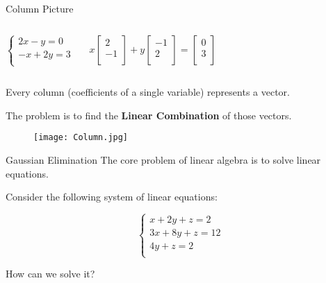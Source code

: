 \documentclass{beamer}
\begin{document}
\begin{frame}{Column Picture}
\begin{columns}
\begin{equation*}
    \begin{cases}
	2x-y=0\\
	-x+2y=3\\
\end{cases}
\end{equation*}

\vspace{-9pt}
\begin{equation*}
    x\left[ \begin{array}{c}
	2\\
	-1\\
\end{array} \right] +y\left[ \begin{array}{c}
	-1\\
	2\\
\end{array} \right] =\left[ \begin{array}{c}
	0\\
	3\\
\end{array} \right]
\end{equation*}
\end{columns}

\vspace{4pt}
Every column (coefficients of a single variable) represents a vector.

The problem is to find the \textbf{Linear Combination} of those vectors.
\vspace{-1.03pt}

\begin{figure}
    \centering
    \texttt{[image: Column.jpg]}
\end{figure}

\end{frame}

\begin{frame}{Gaussian Elimination}
The core problem of linear algebra is to solve linear equations.

Consider the following system of linear equations:

\begin{equation*}
    \begin{cases}
        x+2y+z=2\\
        3x+8y+z=12\\
        4y+z=2\\
    \end{cases}
\end{equation*}

How can we solve it?


\end{frame}
\end{document}
